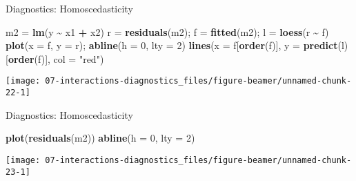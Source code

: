 \documentclass[
  ignorenonframetext,
]{beamer}
\newenvironment{Shaded}{\begin{snugshade}}{\end{snugshade}}
\newcommand{\AttributeTok}[1]{\textcolor[rgb]{0.13,0.29,0.53}{#1}}
\newcommand{\DecValTok}[1]{\textcolor[rgb]{0.00,0.00,0.81}{#1}}
\newcommand{\FunctionTok}[1]{\textcolor[rgb]{0.13,0.29,0.53}{\textbf{#1}}}
\newcommand{\NormalTok}[1]{#1}
\newcommand{\OtherTok}[1]{\textcolor[rgb]{0.56,0.35,0.01}{#1}}
\newcommand{\SpecialCharTok}[1]{\textcolor[rgb]{0.81,0.36,0.00}{\textbf{#1}}}
\newcommand{\StringTok}[1]{\textcolor[rgb]{0.31,0.60,0.02}{#1}}
\begin{document}
\begin{frame}[fragile]{Diagnostics: Homoscedasticity}
\label{diagnostics-homoscedasticity-2}
\begin{Shaded}
\begin{Highlighting}[]
\NormalTok{m2 }\OtherTok{=} \FunctionTok{lm}\NormalTok{(y }\SpecialCharTok{\textasciitilde{}}\NormalTok{ x1 }\SpecialCharTok{+}\NormalTok{ x2)}
\NormalTok{r }\OtherTok{=} \FunctionTok{residuals}\NormalTok{(m2); f }\OtherTok{=} \FunctionTok{fitted}\NormalTok{(m2); l }\OtherTok{=} \FunctionTok{loess}\NormalTok{(r }\SpecialCharTok{\textasciitilde{}}\NormalTok{ f)}
\FunctionTok{plot}\NormalTok{(}\AttributeTok{x =}\NormalTok{ f, }\AttributeTok{y =}\NormalTok{ r); }\FunctionTok{abline}\NormalTok{(}\AttributeTok{h =} \DecValTok{0}\NormalTok{, }\AttributeTok{lty =} \DecValTok{2}\NormalTok{)}
\FunctionTok{lines}\NormalTok{(}\AttributeTok{x =}\NormalTok{ f[}\FunctionTok{order}\NormalTok{(f)], }\AttributeTok{y =} \FunctionTok{predict}\NormalTok{(l)[}\FunctionTok{order}\NormalTok{(f)], }\AttributeTok{col =} \StringTok{"red"}\NormalTok{)}
\end{Highlighting}
\end{Shaded}

\texttt{[image: 07-interactions-diagnostics\_files/figure-beamer/unnamed-chunk-22-1]}
\end{frame}

\begin{frame}[fragile]{Diagnostics: Homoscedasticity}
\label{diagnostics-homoscedasticity-3}
\begin{Shaded}
\begin{Highlighting}[]
\FunctionTok{plot}\NormalTok{(}\FunctionTok{residuals}\NormalTok{(m2))}
\FunctionTok{abline}\NormalTok{(}\AttributeTok{h =} \DecValTok{0}\NormalTok{, }\AttributeTok{lty =} \DecValTok{2}\NormalTok{)}
\end{Highlighting}
\end{Shaded}

\texttt{[image: 07-interactions-diagnostics\_files/figure-beamer/unnamed-chunk-23-1]}
\end{frame}
\end{document}
